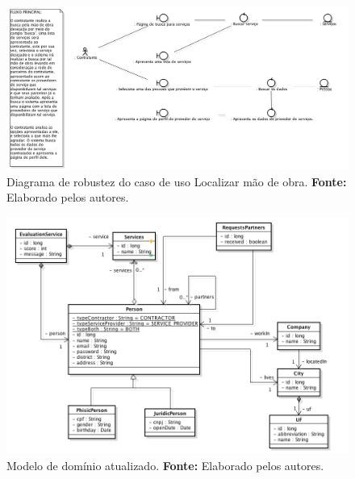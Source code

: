\newpage
\begin{figure}[h!]
	\centerline{\includegraphics[scale=0.35]{./imagens/robustez.png}}
	\caption[Diagrama de robustez do caso de uso Localizar mão de obra]
	{Diagrama de robustez do caso de uso Localizar mão de obra. \textbf{Fonte:} Elaborado pelos autores.}
	\label{fig:diagrama_robustez_localizar_mao_de_obra}
\end{figure}

\begin{figure}[h!]
	\centerline{\includegraphics[scale=0.6]{./imagens/modelo-dominio-com-atributos.png}}
	\caption[Modelo de domínio atualizado]
	{Modelo de domínio atualizado. \textbf{Fonte:} Elaborado pelos autores.}
	\label{fig:modelo_dominio_atualizado}
\end{figure} 

\newpage

